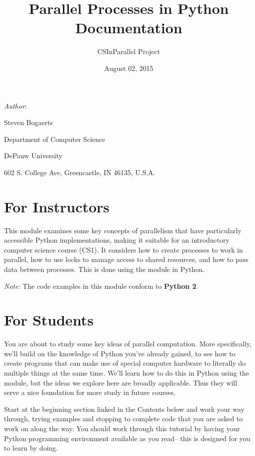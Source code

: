 \documentclass[letterpaper,10pt,openany,oneside]{sphinxmanual}
\title{Parallel Processes in Python Documentation}
\date{August 02, 2015}
\author{CSInParallel Project}
\begin{document}
\maketitle
\tableofcontents
{}\label{index::doc}


\emph{Author}:

\begin{DUlineblock}{0em}
\item[] Steven Bogaerts
\item[] Department of Computer Science
\item[] DePauw University
\item[] 602 S. College Ave, Greencastle, IN  46135, U.S.A.
\end{DUlineblock}


\chapter{For Instructors}
\label{index:parallel-processes-in-python}\label{index:for-instructors}
This module examines some key concepts of parallelism that have particularly accessible Python implementations, making it suitable for an introductory computer science course (CS1). It considers how to create processes to work in parallel, how to use locks to manage access to shared resources, and how to pass data between processes. This is done using the  module in Python.

\emph{Note:} The code examples in this module conform to \textbf{Python 2}.


\chapter{For Students}
\label{index:for-students}
You are about to study some key ideas of parallel computation. More specifically, we'll build on the knowledge of Python you've already gained, to see how to create programs that can make use of special computer hardware to literally do multiple things at the same time. We'll learn how to do this in Python using the  module, but the ideas we explore here are broadly applicable. Thus they will serve a nice foundation for more study in future courses.

Start at the beginning section linked in the Contents below and work your way through, trying examples and stopping to complete code that you are asked to work on along the way.  You should work through this tutorial by having your Python programming environment available as you read-- this is designed for you to learn by doing.
\end{document}
